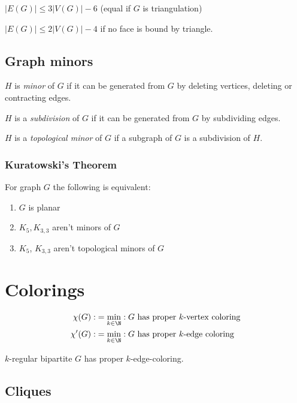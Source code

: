 \spacing

$|E(G)| \leq 3|V(G)|-6$ (equal if $G$ is triangulation)

$|E(G)| \leq 2|V(G)|-4$ if no face is bound by triangle.

\subsection*{Graph minors}

$H$ is \emph{minor} of $G$ if it can be generated from $G$ by deleting vertices, deleting or contracting edges.

\spacing

$H$ is a \emph{subdivision} of $G$ if it can be generated from $G$ by subdividing edges.

\spacing

$H$ is a \emph{topological minor} of $G$ if a subgraph of $G$ is a subdivision of $H$.

\subsubsection*{Kuratowski's Theorem}

For graph $G$ the following is equivalent:

\begin{enumerate}[label=(\alph*)]
	\item $G$ is planar
	\item $K_5, K_{3,3}$ aren't minors of $G$
	\item $K_5$, $K_{3,3}$ aren't topological minors of $G$
\end{enumerate}


\section*{Colorings}

\vspace*{-4mm}
\begin{align*}
\chi(G) :&= \min_{k \in \N} : G \text{ has proper $k$-vertex coloring} \\
\chi'(G) :&= \min_{k \in \N} : G \text{ has proper $k$-edge coloring}
\end{align*}

$k$-regular bipartite $G$ has proper $k$-edge-coloring.

\subsection*{Cliques}


